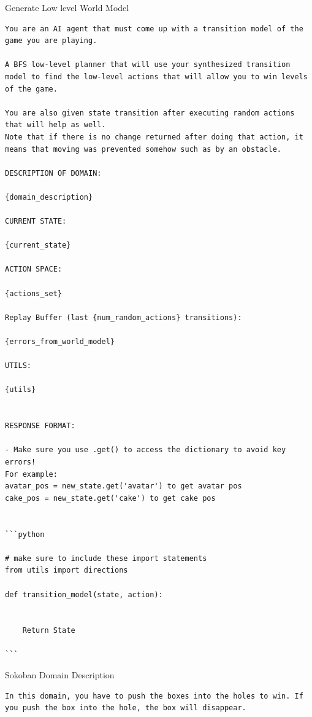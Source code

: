 \documentclass{article}
\theoremstyle{plain}
\theoremstyle{definition}
\theoremstyle{remark}
\begin{document}
\begin{mybox}[boxrule=0pt, parbox=false, opacityframe=1, colframe=black, label=box:gen_low_level_world_model_prompt]{Generate Low level World Model}
\begin{lstlisting}[basicstyle=\ttfamily\small, breaklines=true]
You are an AI agent that must come up with a transition model of the game you are playing. 

A BFS low-level planner that will use your synthesized transition model to find the low-level actions that will allow you to win levels of the game.

You are also given state transition after executing random actions that will help as well.
Note that if there is no change returned after doing that action, it means that moving was prevented somehow such as by an obstacle. 

DESCRIPTION OF DOMAIN:

{domain_description}

CURRENT STATE:

{current_state}

ACTION SPACE:

{actions_set}

Replay Buffer (last {num_random_actions} transitions):

{errors_from_world_model}

UTILS:

{utils}


RESPONSE FORMAT:

- Make sure you use .get() to access the dictionary to avoid key errors!
For example:
avatar_pos = new_state.get('avatar') to get avatar pos 
cake_pos = new_state.get('cake') to get cake pos


```python

# make sure to include these import statements
from utils import directions

def transition_model(state, action):


    Return State

```

\end{lstlisting}
\end{mybox}

\begin{mybox}[boxrule=0pt, parbox=false, opacityframe=1, colframe=black, label=box:sokoban_domain_description]{Sokoban Domain Description}
\begin{lstlisting}[basicstyle=\ttfamily\small, breaklines=true]
In this domain, you have to push the boxes into the holes to win. If you push the box into the hole, the box will disappear.
\end{lstlisting}
\end{mybox}
\end{document}
